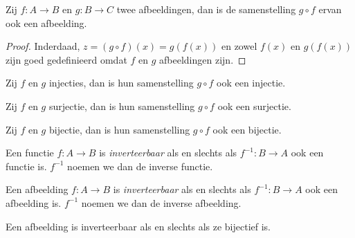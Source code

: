\documentclass[main.tex]{subfiles}
\begin{document}
\begin{st}
  Zij $f: A \rightarrow B$ en $g: B \rightarrow C$ twee afbeeldingen, dan is de samenstelling $g \circ f$ ervan ook een afbeelding.

  \begin{proof}
    Inderdaad, $z = (g \circ f)(x) = g(f(x))$ en zowel $f(x)$ en $g(f(x))$ zijn goed gedefinieerd omdat $f$ en $g$ afbeeldingen zijn. 
  \end{proof}
\end{st}

\begin{st}
  Zij $f$ en $g$ injecties, dan is hun samenstelling $g \circ f$ ook een injectie.
\end{st}

\begin{st}
  Zij $f$ en $g$ surjectie, dan is hun samenstelling $g \circ f$ ook een surjectie.
\end{st}

\begin{st}
  Zij $f$ en $g$ bijectie, dan is hun samenstelling $g \circ f$ ook een bijectie.
\end{st}

\begin{de}
  Een functie $f: A \rightarrow B$ is \emph{inverteerbaar} als en slechts als $f^{-1}: B \rightarrow A$ ook een functie is. $f^{-1}$ noemen we dan de inverse functie.
\end{de}

\begin{de}
  Een afbeelding $f: A \rightarrow B$ is \emph{inverteerbaar} als en slechts als $f^{-1}: B \rightarrow A$ ook een afbeelding is. $f^{-1}$ noemen we dan de inverse afbeelding.
\end{de}

\begin{st}
  Een afbeelding is inverteerbaar als en slechts als ze bijectief is.
\end{st}
\end{document}
